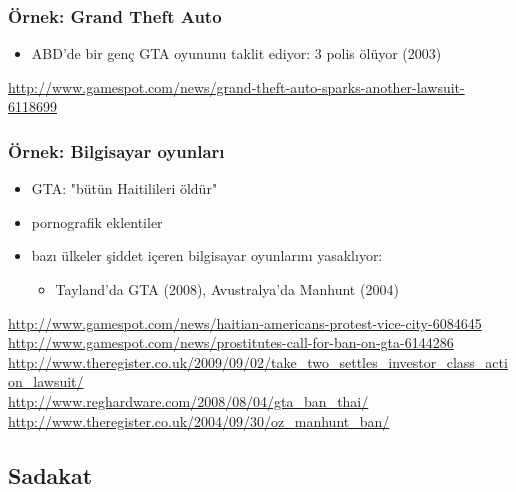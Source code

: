 \documentclass[dvipsnames]{beamer}
\theoremstyle{definition}
\theoremstyle{example}
\theoremstyle{plain}
\begin{document}
\begin{frame}
  \frametitle{Örnek: Grand Theft Auto}

  \begin{center}
  \end{center}

  \begin{itemize}
    \item ABD'de bir genç GTA oyununu taklit ediyor: 3 polis ölüyor (2003)
  \end{itemize}

  \medskip
  \tiny{\url{http://www.gamespot.com/news/grand-theft-auto-sparks-another-lawsuit-6118699}}\\
\end{frame}

\begin{frame}
  \frametitle{Örnek: Bilgisayar oyunları}

  \begin{itemize}
    \item GTA: "bütün Haitilileri öldür"
    \item pornografik eklentiler

    \bigskip
    \item bazı ülkeler şiddet içeren bilgisayar oyunlarını yasaklıyor:
    \begin{itemize}
      \item Tayland'da GTA (2008), Avustralya'da Manhunt (2004)
    \end{itemize}
  \end{itemize}

  \medskip
  \tiny{\url{http://www.gamespot.com/news/haitian-americans-protest-vice-city-6084645}}\\
  \tiny{\url{http://www.gamespot.com/news/prostitutes-call-for-ban-on-gta-6144286}}\\
  \tiny{\url{http://www.theregister.co.uk/2009/09/02/take_two_settles_investor_class_action_lawsuit/}}\\
  \tiny{\url{http://www.reghardware.com/2008/08/04/gta_ban_thai/}}\\
  \tiny{\url{http://www.theregister.co.uk/2004/09/30/oz_manhunt_ban/}}\\
\end{frame}

\subsection{Sadakat}
\end{document}
